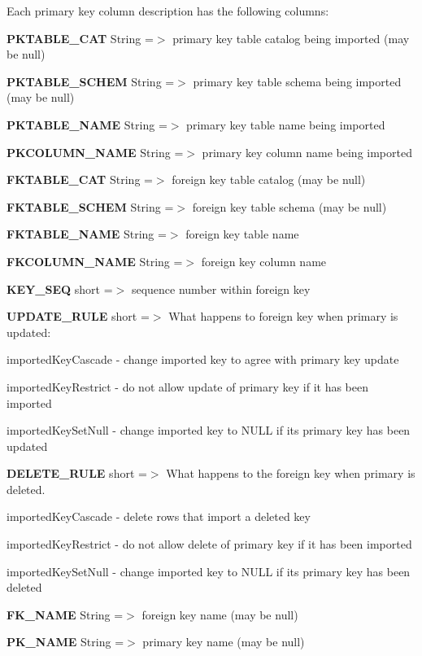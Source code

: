 Each primary key column description has the following columns\+: 
\begin{DoxyEnumerate}
\item {\bfseries P\+K\+T\+A\+B\+L\+E\+\_\+\+C\+AT} String =$>$ primary key table catalog being imported (may be null) 
\item {\bfseries P\+K\+T\+A\+B\+L\+E\+\_\+\+S\+C\+H\+EM} String =$>$ primary key table schema being imported (may be null) 
\item {\bfseries P\+K\+T\+A\+B\+L\+E\+\_\+\+N\+A\+ME} String =$>$ primary key table name being imported 
\item {\bfseries P\+K\+C\+O\+L\+U\+M\+N\+\_\+\+N\+A\+ME} String =$>$ primary key column name being imported 
\item {\bfseries F\+K\+T\+A\+B\+L\+E\+\_\+\+C\+AT} String =$>$ foreign key table catalog (may be null) 
\item {\bfseries F\+K\+T\+A\+B\+L\+E\+\_\+\+S\+C\+H\+EM} String =$>$ foreign key table schema (may be null) 
\item {\bfseries F\+K\+T\+A\+B\+L\+E\+\_\+\+N\+A\+ME} String =$>$ foreign key table name 
\item {\bfseries F\+K\+C\+O\+L\+U\+M\+N\+\_\+\+N\+A\+ME} String =$>$ foreign key column name 
\item {\bfseries K\+E\+Y\+\_\+\+S\+EQ} short =$>$ sequence number within foreign key 
\item {\bfseries U\+P\+D\+A\+T\+E\+\_\+\+R\+U\+LE} short =$>$ What happens to foreign key when primary is updated\+: 
\begin{DoxyItemize}
\item imported\+Key\+Cascade -\/ change imported key to agree with primary key update 
\item imported\+Key\+Restrict -\/ do not allow update of primary key if it has been imported 
\item imported\+Key\+Set\+Null -\/ change imported key to N\+U\+LL if its primary key has been updated 
\end{DoxyItemize}
\item {\bfseries D\+E\+L\+E\+T\+E\+\_\+\+R\+U\+LE} short =$>$ What happens to the foreign key when primary is deleted. 
\begin{DoxyItemize}
\item imported\+Key\+Cascade -\/ delete rows that import a deleted key 
\item imported\+Key\+Restrict -\/ do not allow delete of primary key if it has been imported 
\item imported\+Key\+Set\+Null -\/ change imported key to N\+U\+LL if its primary key has been deleted 
\end{DoxyItemize}
\item {\bfseries F\+K\+\_\+\+N\+A\+ME} String =$>$ foreign key name (may be null) 
\item {\bfseries P\+K\+\_\+\+N\+A\+ME} String =$>$ primary key name (may be null) 
\end{DoxyEnumerate}


